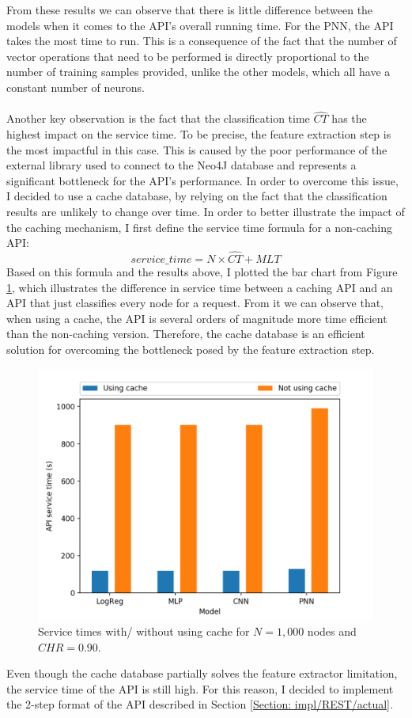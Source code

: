 			From these results we can observe that there is little difference between the models when it comes to the API's overall running time. For the PNN, the API takes the most time to run. This is a consequence of the fact that the number of vector operations that need to be performed is directly proportional to the number of training samples provided, unlike the other models, which all have a constant number of neurons. 
			\\ \\
			Another key observation is the fact that the classification time $\hat{CT}$ has the highest impact on the service time. To be precise, the feature extraction step is the most impactful in this case. This is caused by the poor performance of the external library used to connect to the Neo4J database and represents a significant bottleneck for the API's performance. In order to overcome this issue, I decided to use a cache database, by relying on the fact that the classification results are unlikely to change over time. In order to better illustrate the impact of the caching mechanism, I first define the service time formula for a non-caching API:
			\begin{equation}
				service\_time = N \times \hat{CT} + MLT
			\end{equation}
			Based on this formula and the results above, I plotted the bar chart from Figure \ref{Fig: eval/service-time/bringing/bar}, which illustrates the difference in service time between a caching API and an API that just classifies every node for a request. From it we can observe that, when using a cache, the API is several orders of magnitude more time efficient than the non-caching version. Therefore, the cache database is an efficient solution for overcoming the bottleneck posed by the feature extraction step.  
			\begin{figure}[H]
				\centering
				\includegraphics[width=.7\textwidth]{graphics/service-time-hist}
				\caption{Service times with/ without using cache for $N=1,000$ nodes and $CHR=0.90$.}
				\label{Fig: eval/service-time/bringing/bar}
			\end{figure}
			Even though the cache database partially solves the feature extractor limitation, the service time of the API is still high. For this reason, I decided to implement the 2-step format of the API described in Section \ref{Section: impl/REST/actual}.
